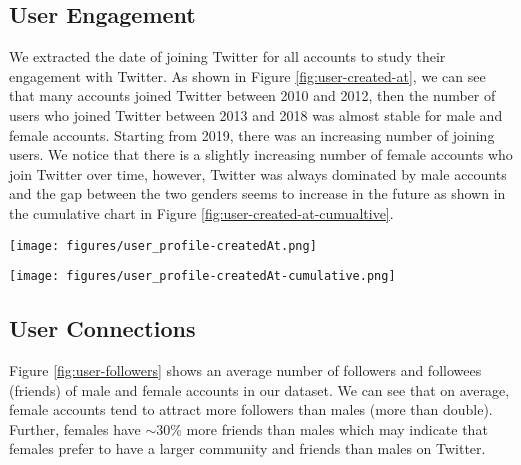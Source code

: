 \documentclass[sigconf,authorversion,nonacm]{acmart}
\begin{document}




\subsection{User Engagement}
We extracted the date of joining Twitter for all accounts to study their engagement with Twitter. As shown in Figure \ref{fig:user-created-at}, we can see that many accounts joined Twitter between 2010 and 2012, then the number of users who joined Twitter between 2013 and 2018 was almost stable for male and female accounts. Starting from 2019, there was an increasing number of joining users. We notice that there is a slightly increasing number of female accounts who join Twitter over time, however, Twitter was always dominated by male accounts and the gap between the two genders seems to increase in the future as shown in the cumulative chart in Figure \ref{fig:user-created-at-cumualtive}.

\begin{figure*}[h]
	\begin{center}
		\texttt{[image: figures/user\_profile-createdAt.png]} 
		\caption{Distribution of Twitter joining date}
		\label{fig:user-created-at}
	\end{center}
\end{figure*}

\begin{figure*}[h]
	\begin{center}
		\texttt{[image: figures/user\_profile-createdAt-cumulative.png]} 
		\caption{Accounts distribution over time}
		\label{fig:user-created-at-cumualtive}
	\end{center}
\end{figure*}

\subsection{User Connections}
Figure \ref{fig:user-followers} shows an average number of followers and followees (friends) of male and female accounts in our dataset. We can see that on average, female accounts tend to attract more followers than males (more than double). Further, females have $\sim$30\% more friends than males which may indicate that females prefer to have a larger community and friends than males on Twitter.
\end{document}
